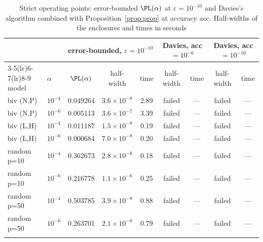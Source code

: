 \begin{table}[t]
\caption{Strict operating points: error-bounded $\PL(\alpha)$ at $\varepsilon=10^{-10}$ and Davies's algorithm combined with Proposition~\ref{prop:prop} at accuracy acc. Half-widths of the enclosures and times in seconds}\label{tab:strict}
\footnotesize\setlength{\tabcolsep}{3pt}
\begin{tabular*}{\textwidth}{@{\extracolsep\fill}llccccccc@{}}
\toprule
 & & \multicolumn{3}{c}{error-bounded, $\varepsilon=10^{-10}$} & \multicolumn{2}{c}{Davies, acc $=10^{-6}$} & \multicolumn{2}{c}{Davies, acc $=10^{-10}$}\\
\cmidrule(lr){3-5}\cmidrule(lr){6-7}\cmidrule(lr){8-9}
model & $\alpha$ & $\PL(\alpha)$ & half-width & time & half-width & time & half-width & time\\
\midrule
biv (N,P) & $10^{-4}$ & 0.049264 & $3.6\times10^{-8}$ & 2.89 & failed & --- & failed & --- \\
biv (N,P) & $10^{-6}$ & 0.005113 & $3.6\times10^{-7}$ & 3.39 & failed & --- & failed & --- \\
\midrule
biv (L,H) & $10^{-4}$ & 0.011187 & $1.5\times10^{-8}$ & 0.19 & failed & --- & failed & --- \\
biv (L,H) & $10^{-6}$ & 0.000684 & $7.0\times10^{-8}$ & 0.20 & failed & --- & failed & --- \\
\midrule
random p=10 & $10^{-4}$ & 0.362673 & $2.8\times10^{-8}$ & 0.18 & failed & --- & failed & --- \\
random p=10 & $10^{-6}$ & 0.216778 & $1.1\times10^{-6}$ & 0.25 & failed & --- & failed & --- \\
\midrule
random p=50 & $10^{-4}$ & 0.503785 & $3.9\times10^{-8}$ & 0.88 & failed & --- & failed & --- \\
random p=50 & $10^{-6}$ & 0.263701 & $2.1\times10^{-6}$ & 0.79 & failed & --- & failed & --- \\
\botrule
\end{tabular*}
\end{table}
